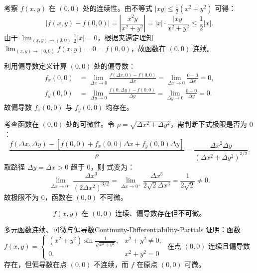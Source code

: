 \begin{myproof}
    考察 $f(x, y)$ 在 $(0, 0)$ 处的连续性。由不等式 $|xy| \leq \frac{1}{2}(x^2 + y^2)$ 可得：
    \begin{equation}
        |f(x, y) - f(0, 0)| = \left| \frac{x^2 y}{x^2 + y^2} \right| = |x| \cdot \frac{|xy|}{x^2 + y^2} \leq \frac{1}{2} |x|.
    \end{equation}
    由于 $\lim_{(x, y) \to (0, 0)} \frac{1}{2} |x| = 0$，根据夹逼定理知 $\lim_{(x, y) \to (0, 0)} f(x, y) = 0 = f(0, 0)$，故函数在 $(0, 0)$ 连续。

    利用偏导数定义计算 $(0, 0)$ 处的偏导数：
    \begin{equation}
        \begin{aligned}
            f_x(0, 0) & = \lim_{\Delta x \to 0} \frac{f(\Delta x, 0) - f(0, 0)}{\Delta x} = \lim_{\Delta x \to 0} \frac{0 - 0}{\Delta x} = 0, \\
            f_y(0, 0) & = \lim_{\Delta y \to 0} \frac{f(0, \Delta y) - f(0, 0)}{\Delta y} = \lim_{\Delta y \to 0} \frac{0 - 0}{\Delta y} = 0.
        \end{aligned}
    \end{equation}
    故偏导数 $f_x(0, 0)$ 与 $f_y(0, 0)$ 均存在。

    考查函数在 $(0, 0)$ 处的可微性。令 $\rho = \sqrt{\Delta x^2 + \Delta y^2}$，需判断下式极限是否为 $0$：
    \begin{equation}
        \frac{f(\Delta x, \Delta y) - [f(0, 0) + f_x(0, 0)\Delta x + f_y(0, 0)\Delta y]}{\rho} = \frac{\Delta x^2 \Delta y}{(\Delta x^2 + \Delta y^2)^{3/2}}.
        \label{eq:diff-limit}
    \end{equation}
    取路径 $\Delta y = \Delta x > 0$ 趋于 $0$，则  式变为：
    \begin{equation}
        \lim_{\Delta x \to 0^+} \frac{\Delta x^3}{(2 \Delta x^2)^{3/2}} = \lim_{\Delta x \to 0^+} \frac{\Delta x^3}{2\sqrt{2} \Delta x^3} = \frac{1}{2\sqrt{2}} \neq 0.
    \end{equation}
    故极限不为 $0$，函数在 $(0, 0)$ 不可微。

    \begin{equation}
        \boxed{f(x, y) \text{ 在 } (0, 0) \text{ 连续、偏导数存在但不可微。}}
    \end{equation}
\end{myproof}


\begin{problem}{多元函数连续、可微与偏导数}{Continuity-Differentiability-Partials}
    证明：函数 $f(x,y) = \begin{cases} (x^2 + y^2) \sin \frac{1}{\sqrt{x^2+y^2}}, & x^2 + y^2 \neq 0, \\ 0, & x^2 + y^2 = 0 \end{cases}$ 在点 $(0,0)$ 连续且偏导数存在，但偏导数在点 $(0,0)$ 不连续，而 $f$ 在原点 $(0,0)$ 可微。
\end{problem}


